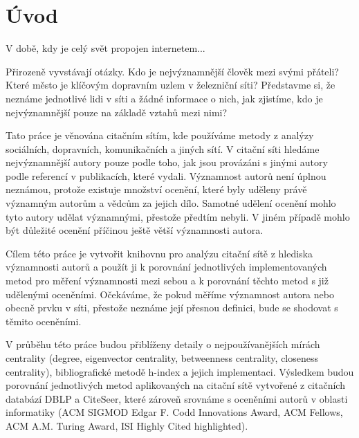\documentclass{bakalarka}
\begin{document}
\tableofcontents
\pagestyle{fancy}

\chapter{Úvod}
V době, kdy je celý svět propojen internetem...

Přirozeně vyvstávají otázky.  
Kdo je nejvýznamnější člověk mezi svými přáteli?
Které město je klíčovým dopravním uzlem v železniční síti?  Představme si, že
neznáme jednotlivé lidi v síti a žádné informace o nich, jak zjistíme, kdo je
nejvýznamnější pouze na základě vztahů mezi nimi? 

Tato práce je věnována citačním sítím, kde používáme metody z analýzy
sociálních, dopravních, komunikačních a jiných sítí. V citační síti hledáme
nejvýznamnější autory pouze podle toho, jak jsou provázáni s jinými autory
podle referencí v publikacích, které vydali. Významnost autorů není úplnou
neznámou, protože existuje množství ocenění, které byly uděleny právě významným
autorům a vědcům za jejich dílo. Samotné udělení ocenění mohlo tyto autory
udělat významnými, přestože předtím nebyli. V jiném případě mohlo být důležité
ocenění příčinou ještě větší významnosti autora. 

Cílem této práce je vytvořit knihovnu pro analýzu citační sítě z hlediska
významnosti autorů a použít ji k porovnání jednotlivých implementovaných metod
pro měření významnosti mezi sebou a k porovnání těchto metod s již udělenými
oceněními. Očekáváme, že pokud měříme významnost autora nebo obecně prvku v
síti, přestože neznáme její přesnou definici, bude se shodovat s těmito
oceněními.

V průběhu této práce budou přiblíženy detaily o nejpoužívanějších mírách
centrality (degree, eigenvector centrality, betweenness centrality, closeness
centrality), bibliografické metodě h-index a jejich implementaci. Výsledkem
budou porovnání jednotlivých metod aplikovaných na citační sítě vytvořené z
citačních databází DBLP a CiteSeer, které zároveň srovnáme s oceněními autorů v
oblasti informatiky (ACM SIGMOD Edgar F. Codd Innovations Award, ACM Fellows,
ACM A.M. Turing Award, ISI Highly Cited highlighted).

\end{document}
